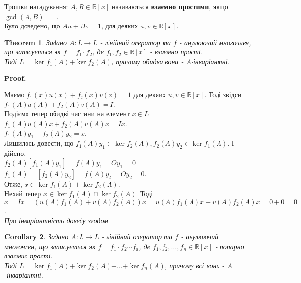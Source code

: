 \documentclass[a4paper, 10pt]{article}
\makeatletter
\theoremstyle{theoremdd}
\newtheorem{theorem}{Theorem}[subsection]
\newtheorem{corollary}[theorem]{Corollary}
\renewenvironment{proof}[1][Proof.\\]{\par
\pushQED{\hfill \qed}%
\normalfont \topsep6\p@\@plus6\p@\relax
\trivlist
\item\relax
{\bfseries
#1\@addpunct{.}}\hspace\labelsep\ignorespaces
}{%
\popQED\endtrivlist\@endpefalse
}
\makeatother
\begin{document}
Трошки нагадування: $A,B \in \mathbb{R}[x]$ називаються \textbf{взаємно простими}, якщо $\gcd(A,B)=1$.\\
Було доведено, що $Au + Bv = 1$, для деяких $u,v \in \mathbb{R}[x]$.

\begin{theorem}
Задано $A: L \to L$ - лінійний оператор та $f$ - анулюючий многочлен, що записується як $f = f_1 \cdot f_2$, де $f_1,f_2 \in \mathbb{R}[x]$ - взаємно прості.\\
Тоді $L = \ker f_1(A) \dot{+} \ker f_2(A)$, причому обидва вони - $A$-інваріантні.
\end{theorem}

\begin{proof}
Маємо $f_1(x)u(x) + f_2(x)v(x) = 1$ для декяих $u,v \in \mathbb{R}[x]$. Тоді звідси\\
$f_1(A)u(A) + f_2(A)v(A) = I$.\\
Подіємо тепер обидві частини на елемент $x \in L$\\
$f_1(A)u(A)x + f_2(A)v(A)x = Ix$.\\
$f_1(A)y_1 + f_2(A)y_2 = x$. \\
Лишилось довести, що $f_1(A) y_1 \in \ker f_2(A), f_2(A) y_2 \in \ker f_1(A)$. І дійсно,\\
$f_2(A) [f_1(A)y_1] = f(A) y_1 = O y_1 = 0$\\
$f_1(A) = [f_2(A)y_2] = f(A) y_2 = O y_2 = 0$.\\
Отже, $x \in \ker f_1(A) + \ker f_2(A)$.\\
Нехай тепер $x \in \ker f_1(A) \cap \ker f_2(A)$. Тоді\\
$x = Ix = (u(A)f_1(A)+v(A)f_2(A))x = u(A)f_1(A)x + v(A)f_2(A)x = 0 + 0 = 0$.
\bigskip \\
\textit{Про інваріантність доведу згодом.}
\end{proof}

\begin{corollary}
Задано $A: L \to L$ - лінійний оператор та $f$ - анулюючий многочлен, що записується як $f = f_1 \cdot f_2 \cdots f_n$, де $f_1,f_2,\dots,f_n \in \mathbb{R}[x]$ - попарно взаємно прості.\\
Тоді $L = \ker f_1(A) \dot{+} \ker f_2(A) \dot{+} \dots \dot{+} \ker f_n(A)$, причому всі вони - $A$-інваріантні.
\end{corollary}
\fi
\end{document}
